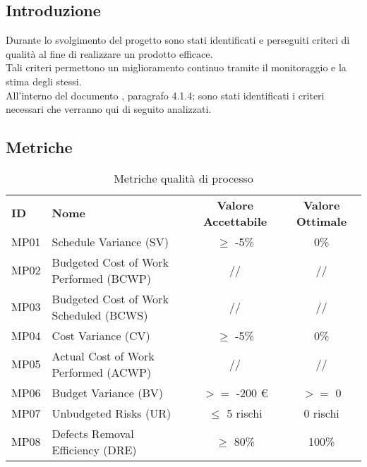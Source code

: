 

\subsection{Introduzione}
Durante lo svolgimento del progetto sono stati identificati e perseguiti criteri di qualità al fine di realizzare un prodotto efficace. \\
Tali criteri permettono un miglioramento continuo tramite il monitoraggio e la stima degli stessi.\\
All'interno del documento , paragrafo 4.1.4; sono stati identificati i criteri necessari che verranno qui di seguito analizzati.
\subsection{Metriche}

\begin{table} [h!]
	\begin{center}
		\begin{tabular} {m{2 cm} m{7 cm} c c }
			\rowcolor{lightgray}
			\textbf{ID} & \textbf{Nome}& \textbf{Valore Accettabile} & \textbf{Valore Ottimale}\\
			MP01 & Schedule Variance (SV)   & $\geq$ -5\%    & 0\% \\
			MP02 & Budgeted Cost of Work Performed (BCWP) & //           & // \\
			MP03 & Budgeted Cost of Work Scheduled (BCWS) & //           & // \\
			MP04 & Cost Variance (CV)   & $\geq$ -5\% & 0\% \\
			MP05 & Actual Cost of Work Performed (ACWP) & //           & // \\
			MP06 & Budget Variance (BV) & $>=$ -200 \euro & $>=$ 0 \\
			MP07 & Unbudgeted Risks (UR)   & $\leq$ 5 rischi & 0 rischi\\
			MP08 & Defects Removal Efficiency (DRE)  & $\geq$  80\% & 100\%\\
			

		\end{tabular}
	\caption{Metriche qualità di processo}
	\end{center}
\end{table}
